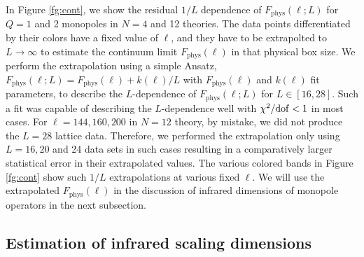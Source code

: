 \documentclass[prd, onecolumn, superscriptaddress, nofootinbib, notitlepage, floatfix]{revtex4-1}
\newcommand\fgn[1]{Figure \ref{fg:#1}}
\newcommand{\phys}{\mathrm{phys}}
\begin{document}
In \fgn{cont}, we show the residual $1/L$ dependence of $F_\phys(\ell;L)$
for $Q=1$ and 2 monopoles in $N=4$ and 12 theories.
The data points differentiated by
their colors have a fixed value of $\ell$, and they have to be
extrapolted to $L\to\infty$ to estimate the continuum limit
$F_\phys(\ell)$ in that physical box size. We perform the extrapolation
using a simple Ansatz, $F_\phys(\ell;L) = F_\phys(\ell) + k(\ell)/L$
with $F_\phys(\ell)$ and $k(\ell)$ fit parameters, to describe the
$L$-dependence of $F_\phys(\ell;L)$ for $L\in[16,28]$.  Such a fit
was capable of describing the $L$-dependence well with $\chi^2/{\rm
dof}<1$ in most cases. For $\ell=144,160,200$ in $N=12$ theory, by
mistake, we did not produce the $L=28$ lattice data.  Therefore, we
performed the extrapolation only using $L=16,20$ and 24 data sets
in such cases resulting in a comparatively larger statistical error
in their extrapolated values.  The various colored bands in \fgn{cont}
show such $1/L$ extrapolations at various fixed $\ell$.  We will
use the extrapolated $F_\phys(\ell)$ in the discussion of infrared
dimensions of monopole operators in the next subsection.

\subsection{Estimation of infrared scaling dimensions}
\end{document}
